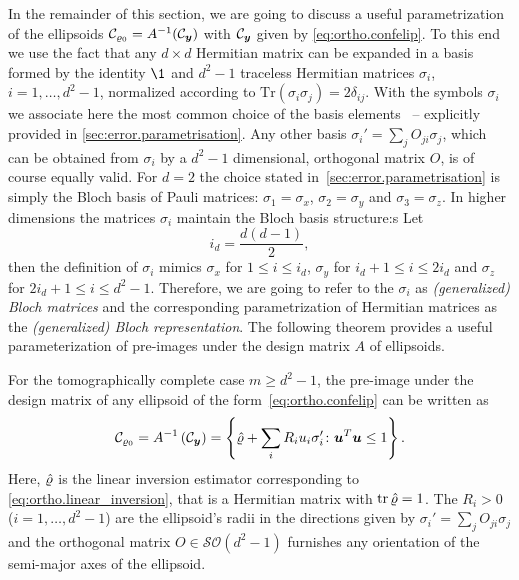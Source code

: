 In the remainder of this section, we are going to discuss a useful parametrization of the ellipsoids $\mathcal{C}_{\varrho_0} = A^{-1}(\mathcal{C}_{\boldsymbol{y}})$ with $\mathcal{C}_{\boldsymbol{y}}$ given by \cref{eq:ortho.confelip}.
To this end we use the fact that any $d\times d$ Hermitian matrix can be expanded in a basis formed by the identity $\1$ and $d^{2}-1$ traceless Hermitian matrices $\sigma_{i}$, $i=1,\ldots,d^{2}-1$, normalized according to $\textrm{Tr}(\sigma_{i}\sigma_{j})=2\delta_{ij}$.
With the symbols $\sigma_{i}$ we associate here the most common choice of the basis elements~\cite{Kimura_2003_Bloch}  --  explicitly provided in \cref{sec:error.parametrisation}.
Any other basis $\sigma_{i}'=\sum_{j}O_{ji}\sigma_{j}$, which can be obtained from $\sigma_i$ by a $d^{2}-1$ dimensional, orthogonal matrix $O$, is of course equally valid.
For $d=2$ the choice stated in~\ref{sec:error.parametrisation} is simply the Bloch basis of Pauli matrices: $\sigma_{1} = \sigma_{x}$, $\sigma_{2} = \sigma_{y}$ and $\sigma_{3} = \sigma_{z}$.
In higher dimensions the matrices $\sigma_{i}$ maintain the Bloch basis structure:s
Let
\[
  \label{eq:ortho.x_yz_index}
  i_{d} = \frac{d(d-1)}{2},
\]
then the definition of $\sigma_i$ mimics $\sigma_{x}$ for $1\leq i\leq i_{d}$, $\sigma_{y}$ for $i_{d}+1\leq i\leq2i_{d}$ and $\sigma_{z}$ for $2i_{d}+1\leq i\leq d^{2}-1$.
Therefore, we are going to refer to the $\sigma_{i}$ as \emph{(generalized) Bloch matrices} and the corresponding parametrization of Hermitian matrices as the \emph{(generalized) Bloch representation}.
The following theorem provides a useful parameterization of pre-images under the design matrix $A$ of ellipsoids.
\begin{theorem}\label{thm:ortho.ellipsoids}
  For the tomographically complete case $m \geq d^2 - 1$, the pre-image under the design matrix of any ellipsoid of the form~\eqref{eq:ortho.confelip} can be written as
  \[
    \label{eq:ortho.ellipsoid}
    \mathcal{C}_{\varrho_0} = A^{-1}\left( \mathcal{C}_{\boldsymbol{y}} \right) = \left\{ \hat{\varrho} + \sum_{i}R_{i}u_{i}\sigma_{i}'\colon {\boldsymbol{u}}^{T}{\boldsymbol{u}}\leq1 \right\}.
  \]
  Here, $\hat{\varrho}$ is the linear inversion estimator corresponding to \cref{eq:ortho.linear_inversion}, that is a Hermitian matrix with $\operatorname{tr} \hat{\varrho} = 1$.
  The $R_{i}>0$ ($i=1,\ldots,d^{2}-1$) are the ellipsoid's radii in the directions given by $\sigma_{i}'=\sum_{j}O_{ji}\sigma_{j}$ and the orthogonal matrix $O\in\mathcal{SO}\left(d^{2}-1\right)$ furnishes any orientation of the semi-major axes of the ellipsoid.
\end{theorem}
